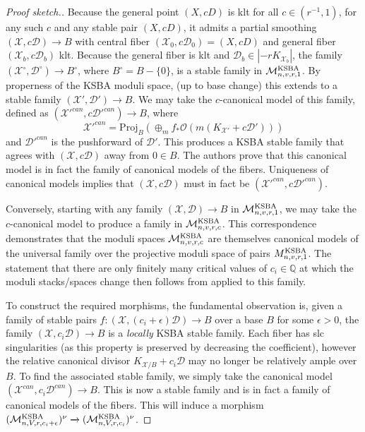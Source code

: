 \documentclass[11pt]{amsart}
\numberwithin{equation}{section}
\theoremstyle{definition}
\newcommand{\bQ}{\mathbb{Q}}
\newcommand{\calX}{\mathcal{X}}
\newcommand{\Proj}{\mathrm{Proj}}
\newcommand{\KSBA}{{\rm KSBA}}
\newcommand{\calD}{\mathcal{D}}
\newcommand{\calO}{\mathcal{O}}
\newcommand{\cM}{\mathcal M}
\begin{document}
\begin{proof}[Proof sketch.]
    Because the general point $(X,cD)$ is klt for all $c \in (r^{-1},1)$, for any such $c$ and any stable pair $(X,cD)$, it admits a partial smoothing $(\calX, c\calD) \to B$ with central fiber $(\calX_0, c\calD_0) = (X,cD)$ and general fiber $(\calX_b, c\calD_b)$ klt.  Because the general fiber is klt and $\calD_b \in |-rK_{\calX_b}|$, the family $(\calX^\circ, \calD^\circ) \to B^\circ$, where $B^\circ = B - \{ 0\}$, is a stable family in $\cM^{\KSBA}_{n,v,r,1}$.  By properness of the KSBA moduli space, (up to base change) this extends to a stable family $(\calX', \calD') \to B$.  We may take the $c$-canonical model of this family, defined as 
     $(\calX'^{can}, c  \calD'^{can}) \to B$, where 
    \[ \calX'^{can}  = \Proj_B(\oplus_mf_*\calO(m(K_{\calX'} + c\calD')))\]
    and $\calD'^{can}$ is the pushforward of $\calD'$.  This produces a KSBA stable family that agrees with $(\calX, c\calD)$ away from $0 \in B$.  The authors prove that this canonical model is in fact the family of canonical models of the fibers.  Uniqueness of canonical models implies that $(\calX, c\calD)$ must in fact be $(\calX'^{can}, c  \calD'^{can})$. 

    Conversely, starting with any family $(\calX, \calD) \to B$ in $\cM^{\KSBA}_{n,v,r,1}$, we may take the $c$-canonical model to produce a family in $\cM^{\KSBA}_{n,v,r,c}$.  This correspondence demonstrates that the moduli spaces $\cM^{\KSBA}_{n,v,r,c}$ are themselves canonical models of the universal family over the projective moduli space of pairs $M^{\KSBA}_{n,v,r,1}$. The statement that there are only finitely many critical values of $c_i \in \bQ$ at which the moduli stacks/spaces change then follows from \cite[Corollary 1.1.5]{BCHM} applied to this family.
    
    To construct the required morphisms, the fundamental observation is, given a family of stable pairs $f:(\calX, (c_i + \epsilon) \calD) \to B$ over a base $B$ for some $\epsilon > 0$, the family $(\calX, c_i  \calD) \to B$ is a \textit{locally} KSBA stable family.  Each fiber has slc singularities (as this property is preserved by decreasing the coefficient), however the relative canonical divisor $K_{\calX/B} + c_i \calD$ may no longer be relatively ample over $B$.  To find the associated stable family, we simply take the canonical model $(\calX^{can}, c_i  \calD^{can}) \to B$.  This is now a stable family and is in fact a family of canonical models of the fibers. This will induce a morphism $(\cM^{\KSBA}_{n,V,r,c_i+\epsilon})^\nu\xrightarrow{}
 (\cM^{\KSBA}_{n,V,r,c_i})^\nu$.  


\end{proof}
\end{document}
